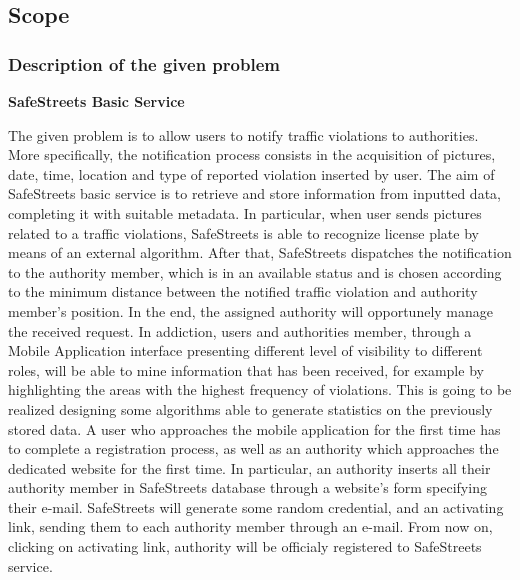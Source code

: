 \documentclass[12pt]{article}
\begin{document}
\subsection{Scope} %
\vspace{5mm}
\subsubsection{Description of the given problem}
\vspace{2mm}
	
	\textbf{SafeStreets Basic Service}

\vspace{3mm}
The given problem is to allow users to notify traffic violations to authorities. More specifically, the notification process consists in the acquisition of pictures, date, time, location and type of reported violation inserted by user. The aim of SafeStreets basic service is to retrieve and store information from inputted data, completing it with suitable metadata.  In particular, when user sends pictures related to a traffic violations, SafeStreets is able to recognize license plate by means of an external algorithm. After that, SafeStreets dispatches the notification to the authority member, which is in an available status and is chosen according to the minimum distance between the notified traffic violation and authority member’s position. In the end, the assigned authority will opportunely manage the received request. In addiction, users and authorities member, through a Mobile Application interface presenting different level of visibility to different roles, will be able to mine information that has been received, for example by highlighting the areas with the highest frequency of violations. This is going to be realized designing some algorithms able to generate statistics on the previously stored data. A user who approaches the mobile application for the first time has to complete a registration process, as well as an authority which approaches the dedicated website for the first time. In particular, an authority inserts all their authority member in SafeStreets database through a website’s form specifying their e-mail. SafeStreets will generate some random credential, and an activating link, sending them to each authority member through an e-mail. From now on, clicking on activating link, authority will be officialy registered to SafeStreets service.

\vspace{5mm}
\end{document}
